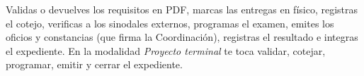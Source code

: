 \documentclass[11pt,a4paper]{article}
\begin{document}
{\small\tableofcontents}
\newpage
\begin{quevasahacer}
Validas o devuelves los requisitos en PDF, marcas las entregas en físico, registras el cotejo, verificas a los sinodales externos, programas el examen, emites los oficios y constancias (que firma la Coordinación), registras el resultado e integras el expediente. En la modalidad \emph{Proyecto terminal} te toca validar, cotejar, programar, emitir y cerrar el expediente.
\end{quevasahacer}




\end{document}
